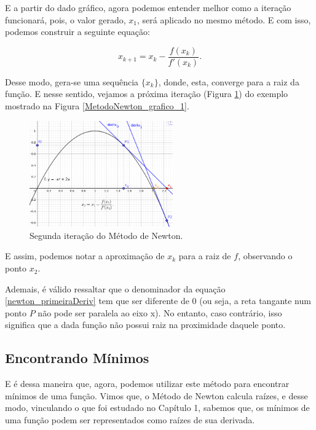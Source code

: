 E a partir do dado gráfico, agora podemos entender melhor como a iteração
funcionará, pois, o valor gerado, $x_1$, será aplicado no mesmo método. E com
isso, podemos construir a seguinte equação:

\begin{equation}
    x_{k+1} = x_{k} - \frac {f(x_{k})}{f'(x_{k})}.
    \label{newton_primeiraDeriv}
\end{equation}

Desse modo, gera-se uma sequência $\{x_k\}$, donde, esta, converge para a
raiz da função. E nesse sentido, vejamos a próxima iteração (Figura
\ref{MetodoNewton_grafico_2}) do exemplo mostrado na Figura
\ref{MetodoNewton_grafico_1}.

\begin{figure}[ht]
    \centering
    \includegraphics[width=0.55\textwidth]
      {src/MetodoNewton_grafico_2.png}
    \caption{
      Segunda iteração do Método de Newton.
    }
    \label{MetodoNewton_grafico_2}
\end{figure}

E assim, podemos notar a aproximação de $x_k$ para a raiz de $f$, observando o
ponto $x_2$.

Ademais, é válido ressaltar que o denominador da equação
\ref{newton_primeiraDeriv} tem que ser diferente de 0 (ou seja, a reta tangante
num ponto $P$ não pode ser paralela ao eixo x). No entanto, caso contrário,
isso significa que a dada função não possui raiz na proximidade daquele ponto.

\subsection{Encontrando Mínimos}

E é dessa maneira que, agora, podemos utilizar este método para encontrar
mínimos de uma função. Vimos que, o Método de Newton calcula raízes, e
desse modo, vinculando o que foi estudado no Capítulo 1, sabemos que, os
mínimos de uma função podem ser representados como raízes de sua derivada.

